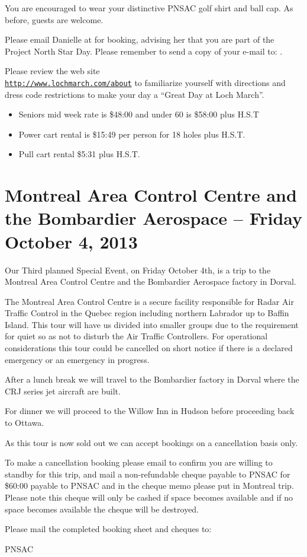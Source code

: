 You are encouraged to wear your distinctive PNSAC golf shirt and ball
cap.  As before, guests are welcome.
 
Please email Danielle at  for booking, advising
her that you are part of the Project North Star Day.  Please remember
to send a copy of your e-mail to: .
 
Please review the web site\\
{\color{blue}\texttt{\url{http://www.lochmarch.com/about}}} to
familiarize yourself with directions and dress code restrictions to
make your day a ``Great Day at Loch March''.

\begin{itemize}
  \item Seniors mid week rate is \$48:00 and under 60 is \$58:00 plus
    H.S.T
  \item Power cart rental is \$15:49 per person for 18 holes plus
    H.S.T.
  \item Pull cart rental \$5:31 plus H.S.T.
\end{itemize}


\section{Montreal Area Control Centre and the Bombardier Aerospace  --
Friday October 4, 2013}
\label{sec:montreal}

Our Third planned Special Event, on Friday October 4th, is a trip to
the Montreal Area Control Centre and the Bombardier Aerospace factory
in Dorval.

The Montreal Area Control Centre is a secure facility responsible for
Radar Air Traffic Control in the Quebec region including northern
Labrador up to Baffin Island. This tour will have us divided into
smaller groups due to the requirement for quiet so as not to disturb
the Air Traffic Controllers. For operational considerations this tour
could be cancelled on short notice if there is a declared emergency or
an emergency in progress.

After a lunch break we will travel to the Bombardier factory in Dorval
where the CRJ series jet aircraft are built.

For dinner we will proceed to the Willow Inn in Hudson before
proceeding back to Ottawa.

As this tour is now sold out we can accept bookings on a cancellation
basis only.

To make a cancellation booking please email
 to confirm you are willing to standby
for this trip, and mail a non-refundable cheque payable to PNSAC for
\$60:00 payable to PNSAC and in the cheque memo please put in Montreal
trip. Please note this cheque will only be cashed if space becomes
available and if no space becomes available the cheque will be
destroyed.

Please mail the completed booking sheet and cheques to:

\address{PNSAC\\
P.O.Box 44005\\
514 Montreal Road\\
Ottawa, ON\\
K1K 4P8}

\begin{footnotesize}
    \raggedleft PNSAC\\
\end{footnotesize}


